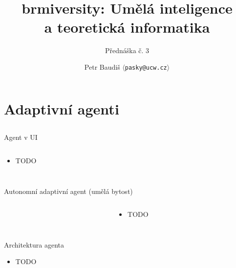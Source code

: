 \documentclass{beamer}
\begin{document}

\title{brmiversity: Umělá inteligence\\a teoretická informatika}
\subtitle{Přednáška č. 3}
\author{Petr Baudiš $\langle${\tt pasky@ucw.cz}$\rangle$}
\date{}
\frame{\titlepage}

\section{Adaptivní agenti}

\subsection{}
\begin{frame}{Agent v UI}
\begin{columns}
\begin{column}{6cm}
\begin{itemize}
\item TODO
\end{itemize}
\end{column}
\begin{column}{5cm}
\end{column}
\end{columns}
\end{frame}

\subsection{}
\begin{frame}{Autonomní adaptivní agent (umělá bytost)}
\begin{columns}
\begin{column}{5cm}
\end{column}
\begin{column}{6cm}
\begin{itemize}
\item TODO
\end{itemize}
\end{column}
\end{columns}
\end{frame}

\subsection{}
\begin{frame}{Architektura agenta}
\begin{itemize}
\item TODO
\end{itemize}
\end{frame}
\end{document}

